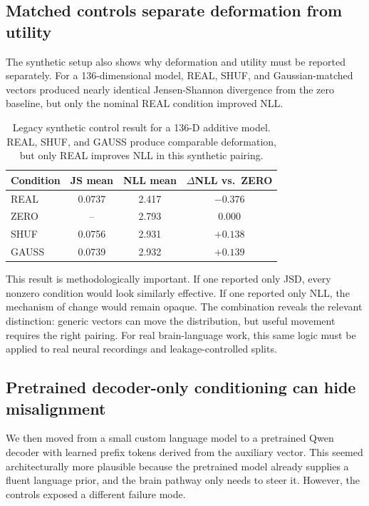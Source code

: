 \documentclass{article}
\begin{document}
\subsection{Matched controls separate deformation from utility}

The synthetic setup also shows why deformation and utility must be reported separately.
For a 136-dimensional model, REAL, SHUF, and Gaussian-matched vectors produced nearly identical Jensen-Shannon divergence from the zero baseline, but only the nominal REAL condition improved NLL.

\begin{table}[t]
\centering
\caption{Legacy synthetic control result for a 136-D additive model. REAL, SHUF, and GAUSS produce comparable deformation, but only REAL improves NLL in this synthetic pairing.}
\label{tab:legacy_controls}
\begin{tabular}{lccc}
\toprule
Condition & JS mean & NLL mean & $\Delta$NLL vs.\ ZERO \\
\midrule
REAL  & 0.0737 & 2.417 & $-0.376$ \\
ZERO  & --     & 2.793 & $0.000$ \\
SHUF  & 0.0756 & 2.931 & $+0.138$ \\
GAUSS & 0.0739 & 2.932 & $+0.139$ \\
\bottomrule
\end{tabular}
\end{table}

This result is methodologically important.
If one reported only JSD, every nonzero condition would look similarly effective.
If one reported only NLL, the mechanism of change would remain opaque.
The combination reveals the relevant distinction: generic vectors can move the distribution, but useful movement requires the right pairing.
For real brain-language work, this same logic must be applied to real neural recordings and leakage-controlled splits.

\subsection{Pretrained decoder-only conditioning can hide misalignment}

We then moved from a small custom language model to a pretrained Qwen decoder with learned prefix tokens derived from the auxiliary vector.
This seemed architecturally more plausible because the pretrained model already supplies a fluent language prior, and the brain pathway only needs to steer it.
However, the controls exposed a different failure mode.
\end{document}
